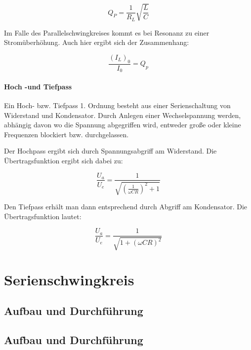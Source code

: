\documentclass[12pt,a4paper]{article}
\begin{document}
\begin{equation}
Q_P = \frac{1}{R_L} \sqrt{\frac{L}{C}}
\label{equ:Güte_Bauteile}
\end{equation}

Im Falle des Parallelschwingkreises kommt es bei Resonanz zu einer Stromüberhöhung. Auch hier ergibt sich der Zusammenhang:

\begin{equation}
\frac{(I_L)_0}{I_0} = Q_p
\end{equation}

\paragraph{Hoch -und Tiefpass}
Ein Hoch- bzw. Tiefpass 1. Ordnung besteht aus einer Serienschaltung von Widerstand und Kondensator. Durch Anlegen einer Wechselspannung werden, abhängig davon wo die Spannung abgegriffen wird, entweder große oder kleine Frequenzen blockiert bzw. durchgelassen.

Der Hochpass ergibt sich durch Spannungsabgriff am Widerstand. Die Übertragsfunktion ergibt sich dabei zu:

\begin{equation}
\frac{U_a}{U_e} = \frac{1}{\sqrt{(\frac{1}{\omega C R})^2+1}}
\end{equation}

Den Tiefpass erhält man dann entsprechend durch Abgriff am Kondensator. Die Übertragsfunktion lautet:

\begin{equation}
\frac{U_a}{U_e} = \frac{1}{\sqrt{1+(\omega C R)^2}}
\end{equation}

\section{Serienschwingkreis}

\subsection{Aufbau und Durchführung}


\subsection{Aufbau und Durchführung}
\end{document}

